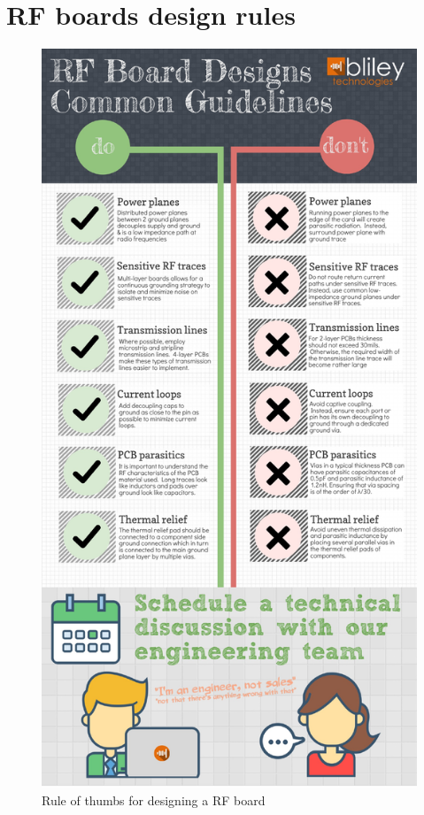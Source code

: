 \chapter{RF boards design rules}
\begin{figure}[h!]
\centering
\includegraphics[trim={0 11cm 0 0},clip,scale=0.65]{figures/rf-board-design-guidelines.pdf}
\caption{Rule of thumbs for designing a RF board\cite{PCBRules}}
\end{figure}

%